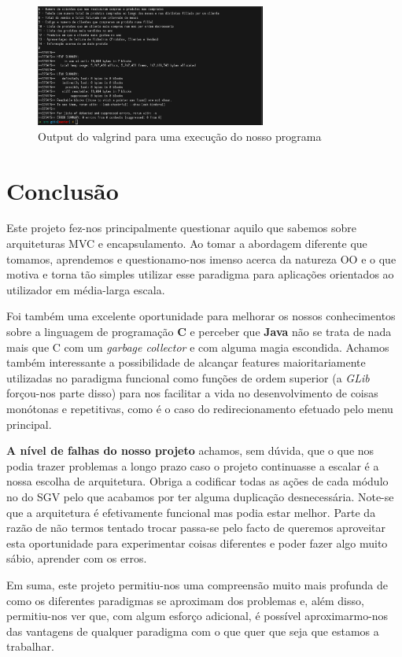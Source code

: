 \documentclass[11pt]{article}
\begin{document}
\vspace{1cm}
\begin{figure}[h]
    \centering
    \includegraphics[width=\textwidth,height=4cm]{images/valgrind.png}
    \caption{Output do valgrind para uma execução do nosso programa}
\end{figure}

\newpage
\section{Conclusão}
Este projeto fez-nos principalmente questionar aquilo que sabemos sobre arquiteturas MVC e encapsulamento. Ao tomar a abordagem diferente que tomamos, aprendemos e questionamo-nos imenso acerca da natureza OO e o que motiva e torna tão simples utilizar esse paradigma para aplicações orientados ao utilizador em média-larga escala.

\vspace{0.5cm}
Foi também uma excelente oportunidade para melhorar os nossos conhecimentos sobre a linguagem de programação \textbf{C} e perceber que \textbf{Java} não se trata de nada mais que C com um \textit{garbage collector} e com alguma magia escondida. Achamos também interessante a possibilidade de alcançar features maioritariamente utilizadas no paradigma funcional como funções de ordem superior (a \textit{GLib} forçou-nos parte disso) para nos facilitar a vida no desenvolvimento de coisas monótonas e repetitivas, como é o caso do redirecionamento efetuado pelo menu principal.

\vspace{0.5cm}
\textbf{A nível de falhas do nosso projeto} achamos, sem dúvida, que o que nos podia trazer problemas a longo prazo caso o projeto continuasse a escalar é a nossa escolha de arquitetura. Obriga a codificar todas as ações de cada módulo no do SGV pelo que acabamos por ter alguma duplicação desnecessária. Note-se que a arquitetura é efetivamente funcional mas podia estar melhor. Parte da razão de não termos tentado trocar passa-se pelo facto de queremos aproveitar esta oportunidade para experimentar coisas diferentes e poder fazer algo muito sábio, aprender com os erros.

\vspace{0.5cm}
Em suma, este projeto permitiu-nos uma compreensão muito mais profunda de como os diferentes paradigmas se aproximam dos problemas e, além disso, permitiu-nos ver que, com algum esforço adicional, é possível aproximarmo-nos das vantagens de qualquer paradigma com o que quer que seja que estamos a trabalhar.
\end{document}
